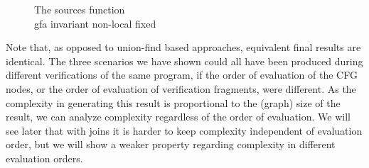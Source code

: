 \begin{figure}[H]

\caption{
The sources function\\
gfa invariant non-local fixed
}
\label{snippet3.16a_graph10}
\end{figure}
Note that, as opposed to union-find based approaches, equivalent final results are identical.
The three scenarios we have shown could all have been produced during different verifications of the same program, 
if the order of evaluation of the CFG nodes, or the order of evaluation of verification fragments, were different.
As the complexity in generating this result is proportional to the (graph) size of the result, 
we can analyze complexity regardless of the order of evaluation.
We will see later that with joins it is harder to keep complexity independent of evaluation order, but we will show a weaker property regarding complexity in different evaluation orders.

